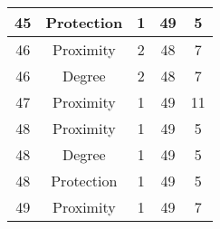 \documentclass[results.tex]{subfiles}
\begin{document}
\begin{center}
\begin{tabular}{| c || c | c | c | c |}
    \hline
    45 & Protection & 1 & 49 & 5 \\ 
    \hline
    46 & Proximity & 2 & 48 & 7 \\ 
    \hline
    46 & Degree & 2 & 48 & 7 \\ 
    \hline
    47 & Proximity & 1 & 49 & 11 \\ 
    \hline
    48 & Proximity & 1 & 49 & 5 \\ 
    \hline
    48 & Degree & 1 & 49 & 5 \\ 
    \hline
    48 & Protection & 1 & 49 & 5 \\ 
    \hline
    49 & Proximity & 1 & 49 & 7 \\ 
    \hline   \end{tabular}
\end{center}
\end{document}
